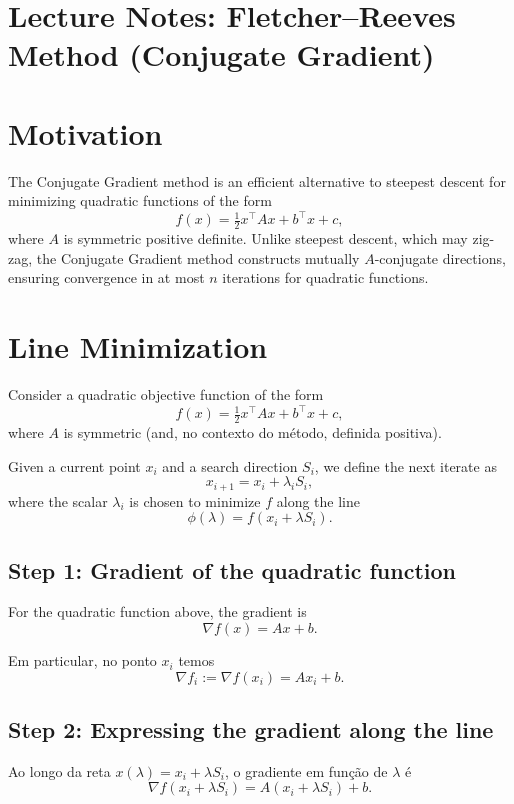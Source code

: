 \documentclass[9pt,a4paper]{extarticle}
\begin{document}
\section*{Lecture Notes: Fletcher--Reeves Method (Conjugate Gradient)}

\section{Motivation}

The Conjugate Gradient method is an efficient alternative to steepest descent for minimizing quadratic functions of the form
\[
f(x)=\tfrac12 x^\top A x + b^\top x + c,
\]
where $A$ is symmetric positive definite. Unlike steepest descent, which may zig-zag, the Conjugate Gradient method constructs mutually $A$-conjugate directions, ensuring convergence in at most $n$ iterations for quadratic functions.

\section{Line Minimization}

Consider a quadratic objective function of the form
\[
f(x) = \tfrac{1}{2} x^\top A x + b^\top x + c,
\]
where $A$ is symmetric (and, no contexto do método, definida positiva).

Given a current point $x_i$ and a search direction $S_i$, we define the next iterate as
\[
x_{i+1} = x_i + \lambda_i S_i,
\]
where the scalar $\lambda_i$ is chosen to minimize $f$ along the line
\[
\phi(\lambda) = f(x_i + \lambda S_i).
\]

\subsection*{Step 1: Gradient of the quadratic function}

For the quadratic function above, the gradient is
\[
\nabla f(x) = A x + b.
\]

Em particular, no ponto $x_i$ temos
\[
\nabla f_i := \nabla f(x_i) = A x_i + b.
\]

\subsection*{Step 2: Expressing the gradient along the line}

Ao longo da reta $x(\lambda) = x_i + \lambda S_i$, o gradiente em função de $\lambda$ é
\[
\nabla f(x_i + \lambda S_i)
= A(x_i + \lambda S_i) + b.
\]
\end{document}
